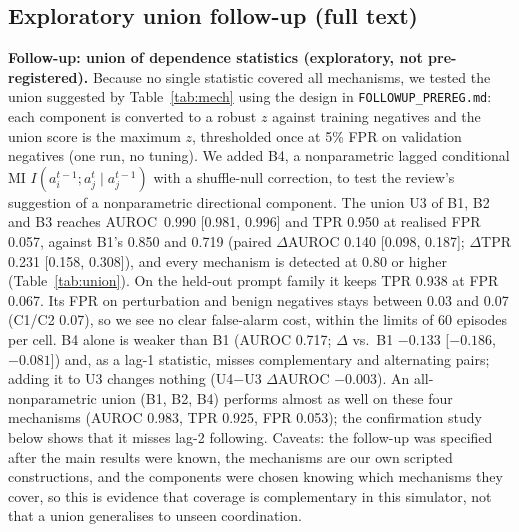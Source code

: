 \documentclass[11pt]{article}
\begin{document}
\subsection*{Exploratory union follow-up (full text)}
\textbf{Follow-up: union of dependence statistics (exploratory, not pre-registered).} Because no single statistic covered all mechanisms, we tested the union suggested by Table~\ref{tab:mech} using the design in \texttt{FOLLOWUP\_PREREG.md}: each component is converted to a robust $z$ against training negatives and the union score is the maximum $z$, thresholded once at 5\% FPR on validation negatives (one run, no tuning). We added B4, a nonparametric lagged conditional MI $I(a_i^{t-1};a_j^t\mid a_j^{t-1})$ with a shuffle-null correction, to test the review's suggestion of a nonparametric directional component. The union U3 of B1, B2 and B3 reaches AUROC \,0.990 [0.981, 0.996] and TPR 0.950 at realised FPR 0.057, against B1's 0.850 and 0.719 (paired $\Delta$AUROC 0.140 [0.098, 0.187]; $\Delta$TPR 0.231 [0.158, 0.308]), and every mechanism is detected at 0.80 or higher (Table~\ref{tab:union}). On the held-out prompt family it keeps TPR 0.938 at FPR 0.067. Its FPR on perturbation and benign negatives stays between 0.03 and 0.07 (C1/C2 0.07), so we see no clear false-alarm cost, within the limits of 60 episodes per cell. B4 alone is weaker than B1 (AUROC 0.717; $\Delta$ vs.\ B1 $-0.133$ [$-0.186$, $-0.081$]) and, as a lag-1 statistic, misses complementary and alternating pairs; adding it to U3 changes nothing (U4$-$U3 $\Delta$AUROC $-0.003$). An all-nonparametric union (B1, B2, B4) performs almost as well on these four mechanisms (AUROC 0.983, TPR 0.925, FPR 0.053); the confirmation study below shows that it misses lag-2 following. Caveats: the follow-up was specified after the main results were known, the mechanisms are our own scripted constructions, and the components were chosen knowing which mechanisms they cover, so this is evidence that coverage is complementary in this simulator, not that a union generalises to unseen coordination.
\end{document}
